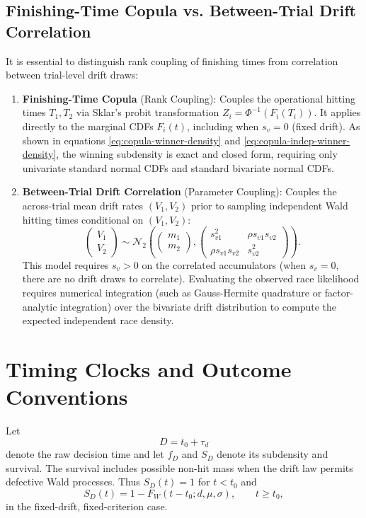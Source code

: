 \documentclass[12pt]{article}
\newcommand{\Normal}{\mathcal{N}}
\newcommand{\PhiN}{\Phi}
\begin{document}
\subsection{Finishing-Time Copula vs. Between-Trial Drift Correlation}
\label{sec:copula-vs-drift}
It is essential to distinguish rank coupling of finishing times from correlation between trial-level drift draws:
\begin{enumerate}
  \item \textbf{Finishing-Time Copula} (Rank Coupling): Couples the operational hitting times $T_1, T_2$ via Sklar's probit transformation $Z_i = \PhiN^{-1}(F_i(T_i))$. It applies directly to the marginal CDFs $F_i(t)$, including when $s_v = 0$ (fixed drift). As shown in equations \eqref{eq:copula-winner-density} and \eqref{eq:copula-indep-winner-density}, the winning subdensity is exact and closed form, requiring only univariate standard normal CDFs and standard bivariate normal CDFs.
  \item \textbf{Between-Trial Drift Correlation} (Parameter Coupling): Couples the across-trial mean drift rates $(V_1, V_2)$ prior to sampling independent Wald hitting times conditional on $(V_1, V_2)$:
  \begin{equation}
    \begin{pmatrix} V_1 \\ V_2 \end{pmatrix} \sim \Normal_2\!\left(\begin{pmatrix} m_1 \\ m_2 \end{pmatrix}, \begin{pmatrix} s_{v1}^2 & \rho s_{v1} s_{v2} \\ \rho s_{v1} s_{v2} & s_{v2}^2 \end{pmatrix}\right).
  \end{equation}
  This model requires $s_v > 0$ on the correlated accumulators (when $s_v = 0$, there are no drift draws to correlate). Evaluating the observed race likelihood requires numerical integration (such as Gauss-Hermite quadrature or factor-analytic integration) over the bivariate drift distribution to compute the expected independent race density.
\end{enumerate}

\section{Timing Clocks and Outcome Conventions}
Let
\[
  D=t_0+\tau_d
\]
denote the raw decision time and let $f_D$ and $S_D$ denote its subdensity and survival. The survival includes possible non-hit mass when the drift law permits defective Wald processes. Thus $S_D(t)=1$ for $t<t_0$ and
\[
  S_D(t)=1-F_W(t-t_0;d,\mu,\sigma), \qquad t\ge t_0,
\]
in the fixed-drift, fixed-criterion case.
\end{document}
